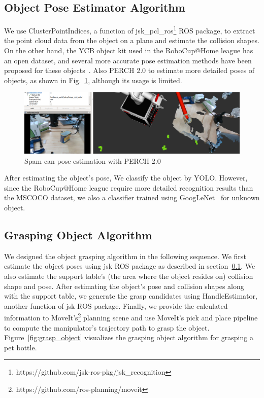\documentclass[runningheads,a4paper]{llncs}
\begin{document}
\subsection{Object Pose Estimator Algorithm}
\label{sec:pose_estimation}
We use ClusterPointIndices, a function of jsk\_pcl\_ros\footnote{https://github.com/jsk-ros-pkg/jsk\_recognition} ROS package, to extract the point cloud data from the object on a plane and estimate the collision shapes.
On the other hand, the YCB object kit used in the RoboCup@Home league has an open dataset, and several more accurate pose estimation methods have been proposed for these objects~\cite{Agarwal2020PERCH2,Bekiroglu2020,Chatzilygeroudis2020}.
Also PERCH 2.0 to estimate more detailed poses of objects, as shown in Fig.~\ref{fig:perch}, although its usage is limited.
\begin{figure}[tbp]
    \centering
    \includegraphics[width=0.6\linewidth]{images/pearch.png}
    \caption{Spam can pose estimation with PERCH 2.0}
    \label{fig:perch}
\end{figure}
After estimating the object’s pose, We classify the object by YOLO.
However, since the RoboCup@Home league require more detailed recognition results than the MSCOCO dataset, we also a classifier trained using GoogLeNet~\cite{Massouh2019} for unknown object.

\subsection{Grasping Object Algorithm}
\label{sec:grasp_object}
We designed the object grasping algorithm in the following sequence. We first estimate the object poses using jsk ROS package as described in section~\ref{sec:pose_estimation}. We also estimate the support table’s (the area where the object resides on) collision shape and pose. After estimating the object’s pose and collision shapes along with the support table, we generate the grasp candidates using HandleEstimator, another function of jsk ROS package. Finally, we provide the calculated information to MoveIt’s\footnote{https://github.com/ros-planning/moveit} planning scene and use MoveIt’s pick and place pipeline to compute the manipulator’s trajectory path to grasp the object. Figure~\ref{fig:grasp_object} visualizes the grasping object algorithm for grasping a pet bottle.
\end{document}
